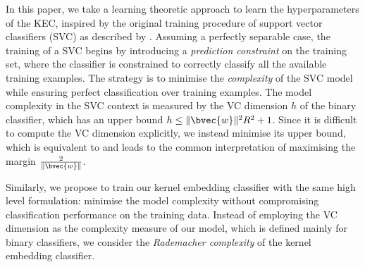 \documentclass{article}
\begin{document}
	In this paper, we take a learning theoretic approach to learn the hyperparameters of the KEC, inspired by the original training procedure of support vector classifiers (SVC) as described by \cite[p. 185]{m2001introduction}. Assuming a perfectly separable case, the training of a SVC begins by introducing a \textit{prediction constraint} on the training set, where the classifier is constrained to correctly classify all the available training examples. The strategy is to minimise the \textit{complexity} of the SVC model while ensuring perfect classification over training examples. The model complexity in the SVC context is measured by the VC dimension $h$ of the binary classifier, which has an upper bound $h \leq \lVert \bvec{w} \rVert^{2} R^{2} + 1$. Since it is difficult to compute the VC dimension explicitly, we instead minimise its upper bound, which is equivalent to and leads to the common interpretation of maximising the margin $\frac{2}{\lVert \bvec{w} \rVert}$.
	
	Similarly, we propose to train our kernel embedding classifier with the same high level formulation: minimise the model complexity without compromising classification performance on the training data. Instead of employing the VC dimension as the complexity measure of our model, which is defined mainly for binary classifiers, we consider the \textit{Rademacher complexity} \citep{bartlett2002rademacher} of the kernel embedding classifier.
	
	
\end{document}
